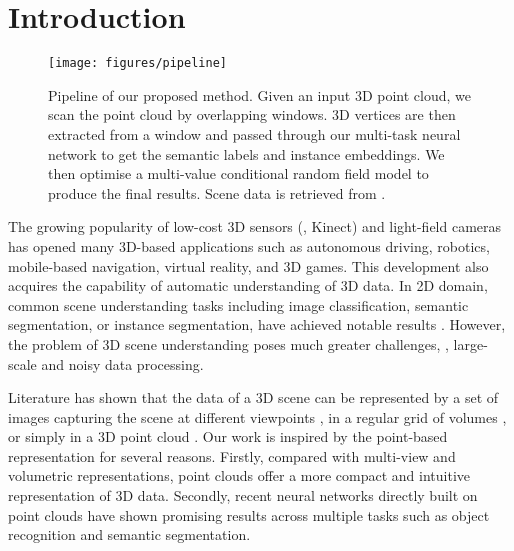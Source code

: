 \documentclass[10pt,twocolumn,letterpaper]{article}
\begin{document}
\section{Introduction}

\begin{figure*}[t]
    \centering
    \texttt{[image: figures/pipeline]}
    \caption{Pipeline of our proposed method. Given an input 3D point cloud, we
      scan the point cloud by overlapping windows. 3D vertices are then
      extracted from a window and passed through our multi-task neural network
      to get the semantic labels and instance embeddings. We then optimise a
      multi-value conditional random field model to produce the final
      results. Scene data is retrieved from \cite{hua-scenenn-3dv16}.}
    \label{fig:pipeline}
\end{figure*}

The growing popularity of low-cost 3D sensors (\eg, Kinect) and light-field
cameras has opened many 3D-based applications such as autonomous driving,
robotics, mobile-based navigation, virtual reality, and 3D games. This
development also acquires the capability of automatic understanding of 3D
data. In 2D domain, common scene understanding tasks including image
classification, semantic segmentation, or instance segmentation, have achieved
notable results \cite{he-maskrcnn-iccv17, chen-deeplab-pami18}. However, the
problem of 3D scene understanding poses much greater challenges, \eg,
large-scale and noisy data processing.

Literature has shown that the data of a 3D scene can be represented by a set of
images capturing the scene at different viewpoints \cite{hermans-dense-icra14,
  wolf-fast-icra15, vineet-incremental-icra15}, in a regular grid of volumes
\cite{wu-shapenets-cvpr15, maturana-voxnet-iros15, nguyen-field-cvpr16}, or
simply in a 3D point cloud \cite{qi-pointnet++-nips17, hua-pointwise-cvpr18,
  wang-dgcnn-arxiv18, huang-rsnet-cvpr18, li-pointcnn-nips18}. Our work is
inspired by the point-based representation for several reasons. Firstly,
compared with multi-view and volumetric representations, point clouds offer a
more compact and intuitive representation of 3D data. Secondly, recent neural
networks directly built on point clouds \cite{qi-pointnet++-nips17,
  hua-pointwise-cvpr18, li-pointcnn-nips18, wang-dgcnn-arxiv18,
  huang-rsnet-cvpr18, klokov-escape-iccv17, landrieu-superpoint-cvpr18,
  li-sonet-cvpr18, xu-spidercnn-eccv18} have shown promising results across
multiple tasks such as object recognition and semantic segmentation.
\end{document}
